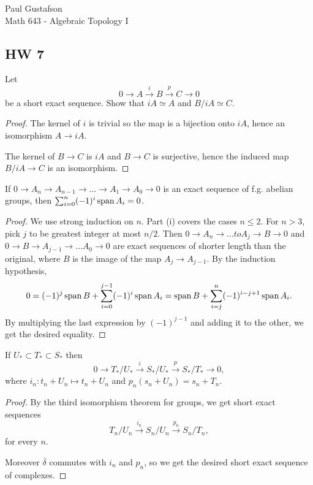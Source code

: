 \documentclass{article}
\begin{document}
\noindent Paul Gustafson\\
\noindent Math 643 - Algebraic Topology I


\subsection*{HW 7}
 Let 
$$0  \to A \overset i \to B \overset p \to C \to 0$$
be a short exact sequence. Show that $iA \simeq A$ and $B/iA \simeq C$.
\begin{proof}
The kernel of $i$ is trivial so the map is a bijection onto $iA$, hence an isomorphism $A \to iA$.

The kernel of $B \to C$ is $iA$ and $B \to C$ is surjective, hence the induced map $B/iA \to C$ is an isomorphism.
\end{proof}

 If $0 \to A_n \to A_{n-1} \to \ldots \to A_1 \to A_0 \to 0$ is an exact sequence of f.g. abelian groups, then
$\sum_{i=0}^n (-1)^i \operatorname{span} A_i = 0$.
\begin{proof}
We use strong induction on $n$. Part (i) covers the cases $n \le 2$. For $n > 3$, pick $j$ to be greatest integer at most $n/2$.
Then $0 \to A_n \to \ldots to A_j \to B \to 0$ and $0 \to B \to A_{j-1} \to \ldots A_0 \to 0$ are exact sequences of shorter length than the original,
where $B$ is the image of the map $A_j \to A_{j-1}$.  By the induction hypothesis, 
$$0 = (-1)^j \operatorname{span} B + \sum_{i=0}^{j-1} (-1)^i \operatorname{span} A_i = \operatorname{span} B + \sum_{i=j}^{n} (-1)^{i-j+1} \operatorname{span} A_i.$$
By multiplying the last expression by $(-1)^{j-1}$ and adding it to the other, we get the desired equality.
\end{proof}

 If $U_* \subset T_* \subset S_*$ then
$$0 \to T_*/U_*  \overset{i}{\to} S_*/U_* \overset{p}{\to} S_*/T_* \to 0,$$
where $i_n: t_n + U_n \mapsto t_n + U_n$ and $p_n(s_n + U_n) = s_n + T_n$.
\begin{proof}
By the third isomorphism theorem for groups, we get short exact sequences
$$T_n/U_n \overset{i_n}{\to} S_n/U_n \overset{p_n}{\to} S_n/T_n,$$
for every $n$.

Moreover $\overline \delta$ commutes with $i_n$ and $p_n$, so we get the desired short exact sequence of complexes.

\end{proof}
\end{document}
